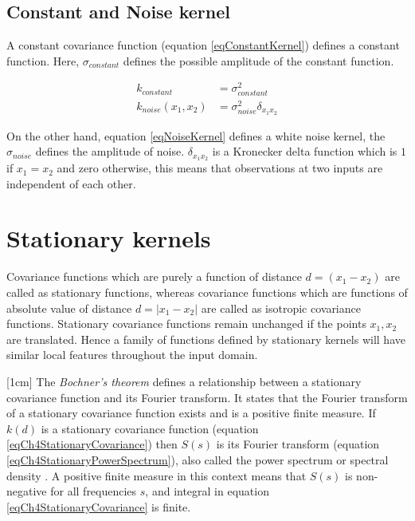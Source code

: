 \subsection{Constant and Noise kernel}
A constant covariance function (equation \ref{eqConstantKernel}) defines a constant function. Here, $\sigma_{constant}$ defines the possible amplitude of the constant function.

\begin{align}
k_{constant} & = \sigma^2_{constant} \label{eqConstantKernel} \\
k_{noise}(x_{1}, x_{2}) & = \sigma^2_{noise}\delta_{x_{1}x_{2}} \label{eqNoiseKernel}
\end{align}

On the other hand, equation \ref{eqNoiseKernel} defines a white noise kernel, the $\sigma_{noise}$ defines the amplitude of noise. $\delta_{x_{1}x_{2}}$ is a Kronecker delta function which is $1$ if $x_{1} = x_{2}$ and zero otherwise, this means that observations at two inputs are independent of each other. 

\section{Stationary kernels} \label{secStationaryKernels}
Covariance functions which are purely a function of distance $d = (x_{1} - x_{2})$ are called as stationary functions, whereas covariance functions which are functions of absolute value of distance $d = |x_{1} - x_{2}|$ are called as isotropic covariance functions. Stationary covariance functions remain unchanged if the points $x_{1}, x_{2}$ are translated. Hence a family of functions defined by stationary kernels will have similar local features throughout the input domain. 

[1cm]
The \textit{Bochner's theorem} defines a relationship between a stationary covariance function and its Fourier transform. It states that the Fourier transform of a stationary covariance function exists and is a positive finite measure. If $k(d)$ is a stationary covariance function (equation \ref{eqCh4StationaryCovariance}) then $S(s)$ is its Fourier transform (equation \ref{eqCh4StationaryPowerSpectrum}), also called the power spectrum or spectral density \cite{bochner1959lectures, Stein1999Springer, cox1977theory}. A positive finite measure in this context means that $S(s)$ is non-negative for all frequencies $s$, and integral in equation \ref{eqCh4StationaryCovariance} is finite.

